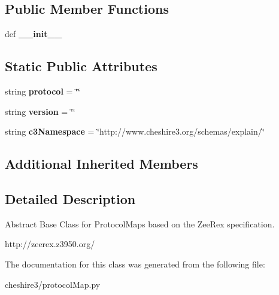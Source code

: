 \subsection*{Public Member Functions}
\begin{DoxyCompactItemize}
\item 
\hypertarget{classcheshire3_1_1protocol_map_1_1_zeerex_protocol_map_aa782a504535c88ea4a86175daccdf5b9}{def {\bfseries \-\_\-\-\_\-init\-\_\-\-\_\-}}\label{classcheshire3_1_1protocol_map_1_1_zeerex_protocol_map_aa782a504535c88ea4a86175daccdf5b9}

\end{DoxyCompactItemize}
\subsection*{Static Public Attributes}
\begin{DoxyCompactItemize}
\item 
\hypertarget{classcheshire3_1_1protocol_map_1_1_zeerex_protocol_map_adf96456fd8e6a64a57e7988e47ffa123}{string {\bfseries protocol} = \char`\"{}\char`\"{}}\label{classcheshire3_1_1protocol_map_1_1_zeerex_protocol_map_adf96456fd8e6a64a57e7988e47ffa123}

\item 
\hypertarget{classcheshire3_1_1protocol_map_1_1_zeerex_protocol_map_a5689ca2f6e56907c7dbd592ef6f052f2}{string {\bfseries version} = \char`\"{}\char`\"{}}\label{classcheshire3_1_1protocol_map_1_1_zeerex_protocol_map_a5689ca2f6e56907c7dbd592ef6f052f2}

\item 
\hypertarget{classcheshire3_1_1protocol_map_1_1_zeerex_protocol_map_a5040af95f3b2fc600e061f91e0593faf}{string {\bfseries c3\-Namespace} = \char`\"{}http\-://www.\-cheshire3.\-org/schemas/explain/\char`\"{}}\label{classcheshire3_1_1protocol_map_1_1_zeerex_protocol_map_a5040af95f3b2fc600e061f91e0593faf}

\end{DoxyCompactItemize}
\subsection*{Additional Inherited Members}


\subsection{Detailed Description}
\begin{DoxyVerb}Abstract Base Class for ProtocolMaps based on the ZeeRex specification.

http://zeerex.z3950.org/
\end{DoxyVerb}
 

The documentation for this class was generated from the following file\-:\begin{DoxyCompactItemize}
\item 
cheshire3/protocol\-Map.\-py\end{DoxyCompactItemize}
